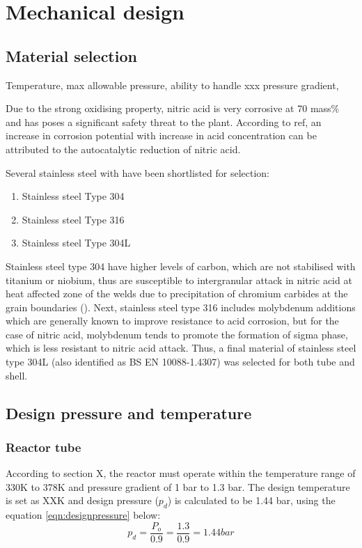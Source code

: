 \section{Mechanical design}
\subsection{Material selection}
Temperature, max allowable pressure, ability to handle xxx pressure gradient, 

Due to the strong oxidising property, nitric acid is very corrosive at 70 mass\% and has poses a significant safety threat to the plant. According to ref, an increase in corrosion potential with increase in acid concentration can be attributed to the autocatalytic reduction of nitric acid. 

Several stainless steel with have been shortlisted for selection: 
\begin{enumerate}
    \item Stainless steel Type 304
    \item Stainless steel Type 316
    \item Stainless steel Type 304L
\end{enumerate}

Stainless steel type 304 have higher levels of carbon, which are not stabilised with titanium or niobium, thus are susceptible to intergranular attack in nitric acid at heat affected zone of the welds due to precipitation of chromium carbides at the grain boundaries (). Next, stainless steel type 316 includes molybdenum additions which are generally known to improve resistance to acid corrosion, but for the case of nitric acid, molybdenum tends to promote the formation of sigma phase, which is less resistant to nitric acid attack. Thus, a final material of stainless steel type 304L (also identified as BS EN 10088-1.4307) was selected for both tube and shell.

\subsection{Design pressure and temperature}
\subsubsection{Reactor tube}
According to section X, the reactor must operate within the temperature range of 330K to 378K and pressure gradient of 1 bar to 1.3 bar. The design temperature is set as XXK and design pressure ($p_d$) is calculated to be 1.44 bar, using the equation \ref{eqn:designpressure} below:
\begin{equation}
    p_d = \frac{P_o}{0.9} = \frac{1.3}{0.9} = 1.44 bar
    \label{eqn:designpressure}
\end{equation}
